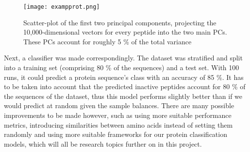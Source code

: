 \begin{figure}[h!]
    \centering
    \texttt{[image: exampprot.png]}
    \caption{Scatter-plot of the first two principal components, projecting the 10,000-dimensional vectors for every peptide into the two main PCs. These PCs account for roughly 5 \% of the total variance}
    \label{fig:diagram_exprot}
\end{figure}

Next, a classifier was made correspondingly. The dataset was stratified and split into a training set (comprising 80 \% of the sequences) and a test set. With 100 runs, it could predict a protein sequence's class with an accuracy of 85 \%. It has to be taken into account that the predicted inactive peptides account for 80 \% of the sequences of the dataset, thus this model performs slightly better than if we would predict at random given the sample balances. There are many possible improvements to be made however, such as using more suitable performance metrics, introducing similarities between amino acids instead of setting them randomly and using more suitable frameworks for our protein classification models, which will all be research topics further on in this project.